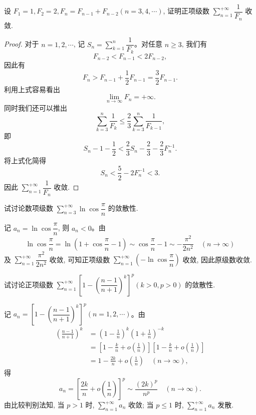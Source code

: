 \begin{example}\label{example:ma-9-2-2}
设 $F_1=1,F_2=2,F_n=F_{n-1}+F_{n-2}(n=3,4,\cdots)$, 证明正项级数 $\sum\limits_{n=1}^{+\infty}\dfrac1{F_n}$ 收敛.
\end{example}


\begin{proof}
对于 $n=1,2,\cdots$, 记 $S_n=\sum\limits_{k=1}^n\dfrac1{F_k}$。对任意 $n\geq3$, 我们有
\[
  F_{n-2}<F_{n-1}<2F_{n-2},
\]
因此有
\[
  F_n>F_{n-1}+\frac12F_{n-1}=\frac32F_{n-1}.
\]
利用上式容易看出
\[
  \lim_{n\to\infty}F_n=+\infty.
\]
同时我们还可以推出
\[
  \sum_{k=3}^n\frac1{F_k}\leq\frac23\sum_{k=3}^n\frac1{F_{k-1}},
\]
即
\[
  S_n-1-\frac12<\frac23S_n-\frac23-\frac23F_n^{-1}.
\]
将上式化简得
\[
  S_n<\frac52-2F_n^{-1}<3.
\]
因此 $\sum\limits_{n=1}^{+\infty}\dfrac1{F_n}$ 收敛.
\end{proof}


\begin{example}\label{example:ma-9-2-3}
试讨论数项级数 $\sum\limits_{n=3}^{+\infty}\ln\cos\dfrac{\pi}{n}$ 的敛散性.
\end{example}


\begin{solve}
记 $a_n=\ln\cos\dfrac{\pi}{n}$, 则 $a_n<0$。由
\[
  \ln\cos\frac{\pi}{n}
  =\ln\left(1+\cos\frac{\pi}{n}-1\right)
  \sim \cos\frac{\pi}{n}-1\sim-\frac{\pi^2}{2n^2}\quad(n\to\infty)
\]
及 $\sum\limits_{n=1}^{+\infty}\dfrac{\pi^2}{2n^2}$ 收敛, 可知正项级数 $\sum\limits_{n=1}^{+\infty}\left(-\ln\cos\dfrac{\pi}{n}\right)$ 收敛, 因此原级数收敛.
\end{solve}


\begin{example}\label{example:ma-9-2-4}
试讨论正项级数 $\sum\limits_{n=1}^{+\infty}\left[1-\left(\dfrac{n-1}{n+1}\right)^k\right]^p(k>0,p>0)$ 的敛散性.
\end{example}


\begin{solve}
记 $a_n=\left[1-\left(\dfrac{n-1}{n+1}\right)^k\right]^p(n=1,2,\cdots)$。由
\[
\begin{aligned}
  \left(\frac{n-1}{n+1}\right)^k
  &=\left(1-\frac1n\right)^k\left(1+\frac1n\right)^{-k}\\
  &=\left[1-\frac{k}{n}+o\left(\frac1n\right)\right]\left[1-\frac{k}{n}+o\left(\frac1n\right)\right]\\
  &=1-\frac{2k}{n}+o\left(\frac1n\right)\quad(n\to\infty),
\end{aligned}
\]
得
\[
  a_n=\left[\frac{2k}{n}+o\left(\frac1n\right)\right]^p\sim\frac{(2k)^p}{n^p}\quad(n\to\infty).
\]
由比较判别法知, 当 $p>1$ 时, $\sum\limits_{n=1}^{+\infty}a_n$ 收敛; 当 $p\leq1$ 时, $\sum\limits_{n=1}^{+\infty}a_n$ 发散.
\end{solve}


